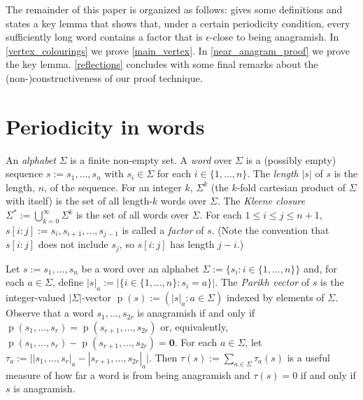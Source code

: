 \documentclass{patmorin}
\DeclareMathOperator{\hist}{p}
\begin{document}
%
%



The remainder of this paper is organized as follows:  gives some definitions and states a key lemma that shows that, under a certain periodicity condition, every sufficiently long word contains a factor that is $\epsilon$-close to being anagramish.
In \cref{vertex_colourings} we prove \cref{main_vertex}.  In \cref{near_anagram_proof} we prove the key lemma. \cref{reflections} concludes with some final remarks about the (non-)constructiveness of our proof technique.

\section{Periodicity in words}
\label{near_anagram_statement}

An \emph{alphabet} $\Sigma$ is a finite non-empty set.  A \emph{word} over $\Sigma$ is a (possibly empty) sequence $s:=s_1,\ldots,s_n$ with $s_i\in\Sigma$ for each $i\in\{1,\ldots,n\}$. The \emph{length} $|s|$ of $s$ is the length, $n$, of the sequence. For an integer $k$, $\Sigma^k$ (the $k$-fold cartesian product of $\Sigma$ with itself) is the set of all length-$k$ words over $\Sigma$.  The \emph{Kleene closure} $\Sigma^*:=\bigcup_{k=0}^\infty \Sigma^k$ is the set of all words over $\Sigma$.  For each $1 \le i \le j\le n+1$, $s[i\mathbin{:}j]:=s_i,s_{i+1},\ldots,s_{j-1}$ is called a \emph{factor} of $s$. (Note the convention that $s[i\mathbin{:}j]$ does not include $s_j$, so $s[i\mathbin{:}j]$ has length $j-i$.)

Let $s:=s_1,\ldots,s_n$ be a word over an alphabet $\Sigma:=\{s_i:i\in\{1,\ldots,n\}\}$ and, for each $a\in \Sigma$, define $|s|_a:=|\{i\in\{1,\ldots,n\}:s_i=a\}|$.  The \emph{Parikh vector} of $s$ is the integer-valued $|\Sigma|$-vector $\hist(s):=(|s|_{a}:a\in\Sigma)$ indexed by elements of $\Sigma$.  Observe that a word $s_1,\ldots,s_{2r}$ is anagramish if and only if $\hist(s_1,\ldots,s_r)=\hist(s_{r+1},\ldots,s_{2r})$ or, equivalently, $\hist(s_1,\ldots,s_r)-\hist(s_{r+1},\ldots,s_{2r})=\boldsymbol{0}$.
For each $a\in\Sigma$, let $\tau_a:=\big||s_1,\ldots,s_r|_{a}-|s_{r+1},\ldots,s_{2r}|_{a}\big|$.
Then $\tau(s):=\sum_{a\in\Sigma}\tau_a(s)$ is a useful measure of how far a word is from being anagramish and $\tau(s)=0$ if and only if $s$ is anagramish.
\end{document}
